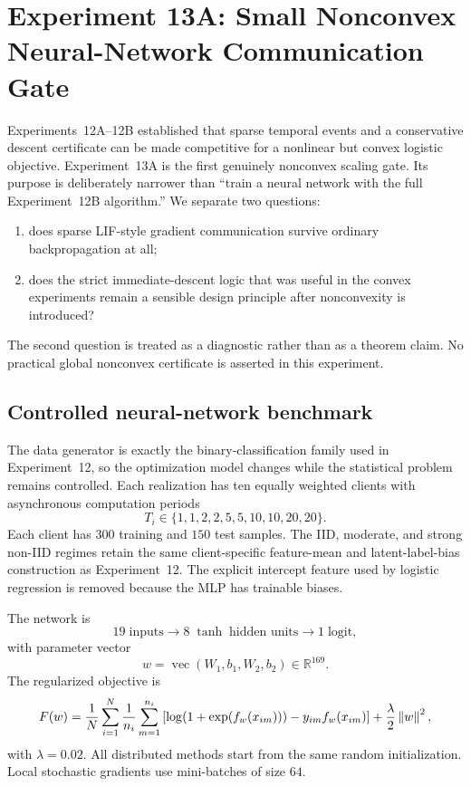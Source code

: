 \section{Experiment 13A: Small Nonconvex Neural-Network Communication Gate}
\label{sec:exp13a}

Experiments~12A--12B established that sparse temporal events and a conservative descent certificate can be made competitive for a nonlinear but convex logistic objective. Experiment~13A is the first genuinely nonconvex scaling gate. Its purpose is deliberately narrower than ``train a neural network with the full Experiment~12B algorithm.'' We separate two questions:
\begin{enumerate}
  \item does sparse LIF-style gradient communication survive ordinary backpropagation at all;
  \item does the strict immediate-descent logic that was useful in the convex experiments remain a sensible design principle after nonconvexity is introduced?
\end{enumerate}
The second question is treated as a diagnostic rather than as a theorem claim. No practical global nonconvex certificate is asserted in this experiment.

\subsection{Controlled neural-network benchmark}

The data generator is exactly the binary-classification family used in Experiment~12, so the optimization model changes while the statistical problem remains controlled. Each realization has ten equally weighted clients with asynchronous computation periods
\begin{equation}
  T_i\in\{1,1,2,2,5,5,10,10,20,20\}.
\end{equation}
Each client has $300$ training and $150$ test samples. The IID, moderate, and strong non-IID regimes retain the same client-specific feature-mean and latent-label-bias construction as Experiment~12. The explicit intercept feature used by logistic regression is removed because the MLP has trainable biases.

The network is
\begin{equation}
  19\;\text{inputs}\rightarrow 8\;\tanh\;\text{hidden units}\rightarrow1\;\text{logit},
\end{equation}
with parameter vector
\begin{equation}
  w=\operatorname{vec}(W_1,b_1,W_2,b_2)\in\mathbb R^{169}.
\end{equation}
The regularized objective is
\begin{equation}
  F(w)
  =\frac{1}{N}\sum_{i=1}^{N}\frac{1}{n_i}\sum_{m=1}^{n_i}
  \left[\log(1+\exp(f_w(x_{im})))-y_{im}f_w(x_{im})\right]
  +\frac{\lambda}{2}\left\lVert w\right\rVert^2,
\end{equation}
with $\lambda=0.02$. All distributed methods start from the same random initialization. Local stochastic gradients use mini-batches of size $64$.

